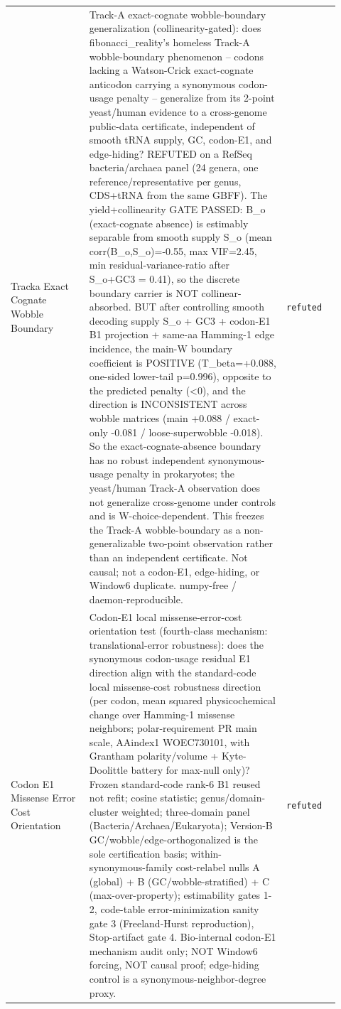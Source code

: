 \begin{longtable}{>{\raggedright\arraybackslash}p{0.22\linewidth}>{\raggedright\arraybackslash}p{0.55\linewidth}>{\raggedright\arraybackslash}p{0.15\linewidth}}
Tracka Exact Cognate Wobble Boundary & Track-A exact-cognate wobble-boundary generalization (collinearity-gated): does fibonacci\_reality's homeless Track-A wobble-boundary phenomenon -- codons lacking a Watson-Crick exact-cognate anticodon carrying a synonymous codon-usage penalty -- generalize from its 2-point yeast/human evidence to a cross-genome public-data certificate, independent of smooth tRNA supply, GC, codon-E1, and edge-hiding? REFUTED on a RefSeq bacteria/archaea panel (24 genera, one reference/representative per genus, CDS+tRNA from the same GBFF). The yield+collinearity GATE PASSED: B\_o (exact-cognate absence) is estimably separable from smooth supply S\_o (mean corr(B\_o,S\_o)=-0.55, max VIF=2.45, min residual-variance-ratio after S\_o+GC3 = 0.41), so the discrete boundary carrier is NOT collinear-absorbed. BUT after controlling smooth decoding supply S\_o + GC3 + codon-E1 B1 projection + same-aa Hamming-1 edge incidence, the main-W boundary coefficient is POSITIVE (T\_beta=+0.088, one-sided lower-tail p=0.996), opposite to the predicted penalty (<0), and the direction is INCONSISTENT across wobble matrices (main +0.088 / exact-only -0.081 / loose-superwobble -0.018). So the exact-cognate-absence boundary has no robust independent synonymous-usage penalty in prokaryotes; the yeast/human Track-A observation does not generalize cross-genome under controls and is W-choice-dependent. This freezes the Track-A wobble-boundary as a non-generalizable two-point observation rather than an independent certificate. Not causal; not a codon-E1, edge-hiding, or Window6 duplicate. numpy-free / daemon-reproducible. & \texttt{refuted} \\
Codon E1 Missense Error Cost Orientation & Codon-E1 local missense-error-cost orientation test (fourth-class mechanism: translational-error robustness): does the synonymous codon-usage residual E1 direction align with the standard-code local missense-cost robustness direction (per codon, mean squared physicochemical change over Hamming-1 missense neighbors; polar-requirement PR main scale, AAindex1 WOEC730101, with Grantham polarity/volume + Kyte-Doolittle battery for max-null only)? Frozen standard-code rank-6 B1 reused not refit; cosine statistic; genus/domain-cluster weighted; three-domain panel (Bacteria/Archaea/Eukaryota); Version-B GC/wobble/edge-orthogonalized is the sole certification basis; within-synonymous-family cost-relabel nulls A (global) + B (GC/wobble-stratified) + C (max-over-property); estimability gates 1-2, code-table error-minimization sanity gate 3 (Freeland-Hurst reproduction), Stop-artifact gate 4. Bio-internal codon-E1 mechanism audit only; NOT Window6 forcing, NOT causal proof; edge-hiding control is a synonymous-neighbor-degree proxy. & \texttt{refuted} \\

\end{longtable}
